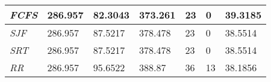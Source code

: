 \documentclass{article}
\begin{document}
\begin{table}[h!]
\begin{tabular}{|l|l|l|l|l|l|l|}
  \textit{FCFS}      & 286.957                                                                          & 82.3043                                                                     & 373.261                                                                            & 23                                                                                    & 0                                                                                   & 39.3185                                                                    \\ \hline
  \textit{SJF}       & 286.957                                                                          & 87.5217                                                                     & 378.478                                                                            & 23                                                                                    & 0                                                                                   & 38.5514                                                                    \\ \hline
  \textit{SRT}       & 286.957                                                                          & 87.5217                                                                     & 378.478                                                                            & 23                                                                                    & 0                                                                                   & 38.5514                                                                    \\ \hline
  \textit{RR}        & 286.957                                                                          & 95.6522                                                                     & 388.87                                                                             & 36                                                                                    & 13                                                                                  & 38.1856                                                                    \\ \hline
  \end{tabular}
  \label{table:1}
\end{table}
\end{document}
